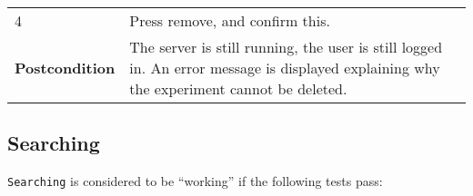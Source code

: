 \begin{longtable}[c]{@{}ll@{}}
\begin{minipage}[t]{0.31\columnwidth}
4
\strut\end{minipage} &
\begin{minipage}[t]{0.63\columnwidth}\raggedright\strut
Press remove, and confirm this.
\strut\end{minipage}\tabularnewline
\begin{minipage}[t]{0.31\columnwidth}\raggedright\strut
\textbf{Postcondition}
\strut\end{minipage} &
\begin{minipage}[t]{0.63\columnwidth}\raggedright\strut
The server is still running, the user is still logged in. An error
message is displayed explaining why the experiment cannot be deleted.
\strut\end{minipage}\tabularnewline
\bottomrule
\end{longtable}

\subsection{Searching}\label{searching}

\texttt{Searching} is considered to be ``working'' if the following
tests pass:

